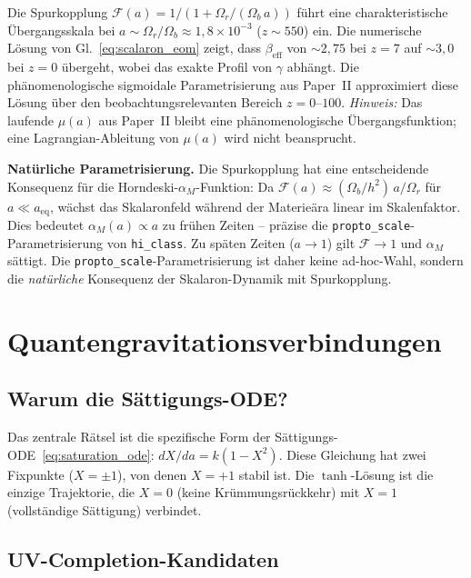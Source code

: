 \documentclass[11pt,a4paper]{article}
\begin{document}
Die Spurkopplung $\mathcal{F}(a) = 1/(1 + \Omega_r/(\Omega_b\,a))$ f\"uhrt eine charakteristische \"Ubergangsskala bei $a \sim \Omega_r/\Omega_b \approx 1{,}8 \times 10^{-3}$ ($z \sim 550$) ein. Die numerische L\"osung von Gl.~\eqref{eq:scalaron_eom} zeigt, dass $\beta_{\mathrm{eff}}$ von $\sim 2{,}75$ bei $z = 7$ auf $\sim 3{,}0$ bei $z = 0$ \"ubergeht, wobei das exakte Profil von $\gamma$ abh\"angt. Die ph\"anomenologische sigmoidale Parametrisierung aus Paper~II approximiert diese L\"osung \"uber den beobachtungsrelevanten Bereich $z = 0$--$100$. \textit{Hinweis:} Das laufende $\mu(a)$ aus Paper~II bleibt eine ph\"anomenologische \"Ubergangsfunktion; eine Lagrangian-Ableitung von $\mu(a)$ wird nicht beansprucht.

\textbf{Nat\"urliche Parametrisierung.} Die Spurkopplung hat eine entscheidende Konsequenz f\"ur die Horndeski-$\alpha_M$-Funktion: Da $\mathcal{F}(a) \approx (\Omega_b/h^2)\,a/\Omega_r$ f\"ur $a \ll a_{\mathrm{eq}}$, w\"achst das Skalaronfeld w\"ahrend der Materie\"ara linear im Skalenfaktor. Dies bedeutet $\alpha_M(a) \propto a$ zu fr\"uhen Zeiten -- pr\"azise die \texttt{propto\_scale}-Parametrisierung von \texttt{hi\_class}. Zu sp\"aten Zeiten ($a \to 1$) gilt $\mathcal{F} \to 1$ und $\alpha_M$ s\"attigt. Die \texttt{propto\_scale}-Parametrisierung ist daher keine ad-hoc-Wahl, sondern die \textit{nat\"urliche} Konsequenz der Skalaron-Dynamik mit Spurkopplung.


\section{Quantengravitationsverbindungen}
\label{sec:quantum_gravity}

\subsection{Warum die S\"attigungs-ODE?}

Das zentrale R\"atsel ist die spezifische Form der S\"attigungs-ODE~\eqref{eq:saturation_ode}: $dX/da = k(1 - X^2)$. Diese Gleichung hat zwei Fixpunkte ($X = \pm 1$), von denen $X = +1$ stabil ist. Die $\tanh$-L\"osung ist die einzige Trajektorie, die $X = 0$ (keine Kr\"ummungsr\"uckkehr) mit $X = 1$ (vollst\"andige S\"attigung) verbindet.

\subsection{UV-Completion-Kandidaten}
\label{subsec:uv_candidates}
\end{document}
